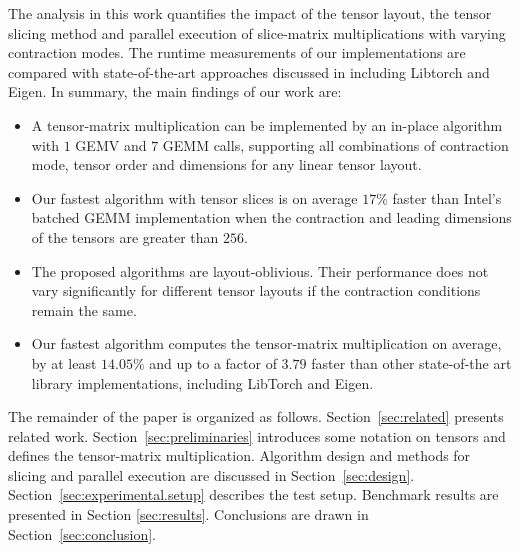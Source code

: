 The analysis in this work quantifies the impact of the tensor layout, the tensor slicing method and parallel execution of slice-matrix multiplications with varying contraction modes.
The runtime measurements of our implementations are compared with state-of-the-art approaches discussed in \citep{springer:2018:design, matthews:2018:high, paszke:2019:pytorch} including Libtorch and Eigen. In summary, the main findings of our work are:
\begin{itemize}
	\item 
	A tensor-matrix multiplication can be implemented by an in-place algorithm with $1$ GEMV and $7$ GEMM calls, supporting all combinations of contraction mode, tensor order and dimensions for any linear tensor layout.
	\item 
	Our fastest algorithm with tensor slices is on average $17$\% faster than Intel's batched GEMM implementation when the contraction and leading dimensions of the tensors are greater than $256$.
	\item 
	The proposed algorithms are layout-oblivious. 
	Their performance does not vary significantly for different tensor layouts if the contraction conditions remain the same.
	\item
	Our fastest algorithm computes the tensor-matrix multiplication on average, by at least $14.05$\% and up to a factor of $3.79$ faster than other state-of-the art library implementations, including LibTorch and Eigen.
\end{itemize}

The remainder of the paper is organized as follows. 
Section~\ref{sec:related} presents related work.
Section~\ref{sec:preliminaries} introduces some notation on tensors and defines the tensor-matrix multiplication.
Algorithm design and methods for slicing and parallel execution are discussed in Section~\ref{sec:design}.
Section~\ref{sec:experimental.setup} describes the test setup. Benchmark results are presented in Section \ref{sec:results}.
Conclusions are drawn in Section~\ref{sec:conclusion}.
